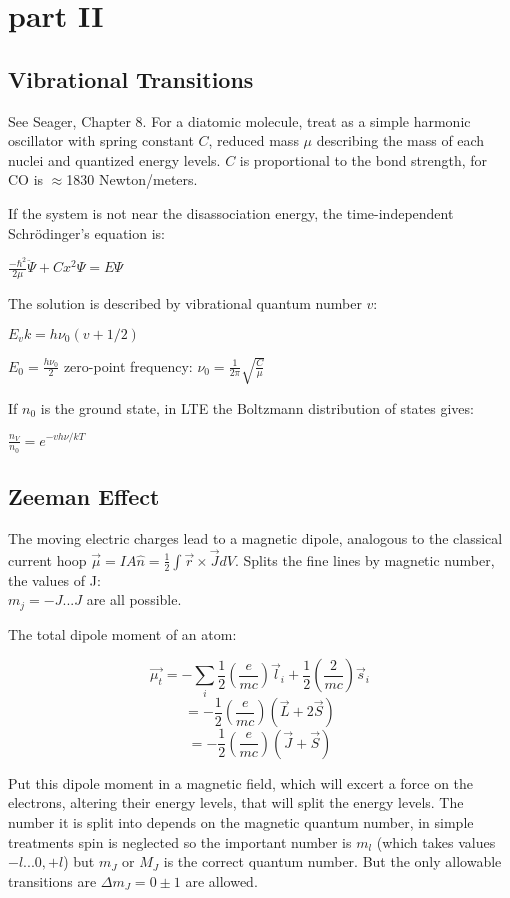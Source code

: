 
\chapter{part II}

\section{Vibrational Transitions}
See Seager, Chapter 8.
For a diatomic molecule, treat as a simple harmonic oscillator with spring constant $C$, reduced mass $\mu$ describing the mass of each nuclei and quantized energy levels. $C$ is proportional to the bond strength, for CO is $\approx$1830 Newton/meters. 

If the system is not near the disassociation energy, the time-independent Schrödinger's equation is:

\(\frac{-\hbar^2}{2\mu}\ddot{\Psi}+Cx^2\Psi=E\Psi\)

The solution  is described by vibrational quantum number $v$:

\(E_vk=h\nu_0(v+1/2)\)

\(E_0=\frac{h\nu_0}{2}\)
zero-point frequency:
\( \nu_0=\frac{1}{2\pi}\sqrt{\frac{C}{\mu}}\)


If $n_0$ is the ground state, in LTE the Boltzmann distribution of states gives:

\(\frac{n_V}{n_0}=e^{-vh\nu/kT}\)


\section{Zeeman Effect}
The moving electric charges lead to a magnetic dipole, analogous to the classical current hoop $\vec{\mu}=IA\hat{n}=\frac{1}{2}\int\vec{r}\times\vec{J} dV$.  
Splits the fine lines by magnetic number, the values of J:\\ $ m_j=-J...J$ are all possible.

The total dipole moment of an atom: 

\[\vec{\mu_{t}}=-\sum_i \frac{1}{2}(\frac{e}{mc})\vec{l}_i+\frac{1}{2}(\frac{2}{mc})\vec{s}_i\]
\[=- \frac{1}{2}(\frac{e}{mc})(\vec{L}+2\vec{S})\]
\[=-\frac{1}{2}(\frac{e}{mc})(\vec{J}+\vec{S})\]

Put this dipole moment in a magnetic field, which will excert a force on the electrons, altering their energy levels, that will split the energy levels. The number it is split into depends on the magnetic quantum number, in simple treatments spin is neglected so the important number is $m_l$ (which takes values $-l...0,+l$) but $m_J$ or $M_J$ is the correct quantum number.
But the only allowable transitions are $\Delta m_J=0\pm1$ are allowed.

